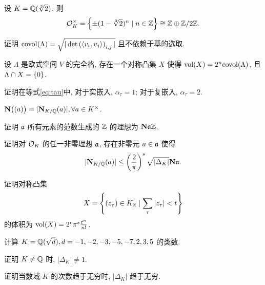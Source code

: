 \begin{example}
设 $K={\mathbb{Q}}(\sqrt[3]{2})$, 则
  \[{\mathcal{O}}_K^\times=\left\{\pm(1-\sqrt[3]{2})^n\mid n\in{\mathbb{Z}}\right\}\cong {\mathbb{Z}}\oplus {\mathbb{Z}}/2{\mathbb{Z}}.\]
\end{example}

\begin{exercise}
证明 ${\mathrm{covol}}(\Lambda)=\sqrt{|\det\left(\langle{v_i,v_j}\rangle\right)_{i,j}|}$ 且不依赖于基的选取.
\end{exercise}
  
\begin{exercise}
设 $\Lambda$ 是欧式空间 $V$ 的完全格, 存在一个对称凸集 $X$ 使得 ${\mathrm{vol}}(X)=2^n{\mathrm{covol}}(\Lambda)$, 且 $\Lambda\cap X=\left\{0\right\}$.
\end{exercise}

\begin{exercise}
证明在等式\eqref{eq:tau}中, 对于实嵌入, $\alpha_\tau=1$; 对于复嵌入, $\alpha_\tau=2$.
\end{exercise}

\begin{exercise}
${\mathbf{N}}\bigl((a)\bigr)=|{\mathbf{N}}_{K/{\mathbb{Q}}}(a)|,\forall a\in K^\times$.
\end{exercise}

\begin{exercise}
证明 ${\mathfrak{a}}$ 所有元素的范数生成的 ${\mathbb{Z}}$ 的理想为 ${\mathbf{N}}{\mathfrak{a}} {\mathbb{Z}}$.
\end{exercise}

\begin{exercise}\label{exe:weak_bound}
证明对 ${\mathcal{O}}_K$ 的任一非零理想 ${\mathfrak{a}}$, 存在非零元 $a\in{\mathfrak{a}}$ 使得
  \[|{\mathbf{N}}_{K/{\mathbb{Q}}}(a)|\le \left(\frac{2}{\pi}\right)^s\sqrt{|\Delta_K|}{\mathbf{N}}{\mathfrak{a}}.\]
\end{exercise}

\begin{exercise}
证明对称凸集
  \[X=\left\{(z_\tau)\in K_{\mathbb{R}}\mid \sum\limits_\tau |z_\tau|<t\right\}\]
的体积为 ${\mathrm{vol}}(X)=2^r\pi^s \frac{t^n}{n!}$.
\end{exercise}

\begin{exercise}
计算 $K={\mathbb{Q}}(\sqrt{d}),d=-1,-2,-3,-5,-7,2,3,5$ 的类数.
\end{exercise}

\begin{exercise}\label{exe:disc_not_pm1}
证明 $K\ne {\mathbb{Q}}$ 时, $|\Delta_K|\neq 1$.
\end{exercise}

\begin{exercise}
证明当数域 $K$ 的次数趋于无穷时, $|\Delta_K|$ 趋于无穷.
\end{exercise}


